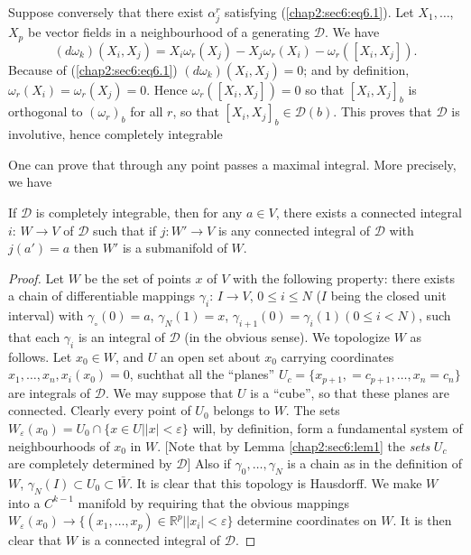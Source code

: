 Suppose conversely that there exist $\alpha^r_j$ satisfying
(\ref{chap2:sec6:eq6.1}). Let 
$X_1, \ldots$, $X_p$ be vector fields in a neighbourhood of a generating
$\mathscr{D}$. We have 
$$
(d \omega_k) (X_i, X_j) = X_i \omega_r (X_j) - X_j \omega_r
(X_i)-\omega_r ([X_i, X_j]). 
$$
Because of (\ref{chap2:sec6:eq6.1}) $(d \omega_k) (X_i, X_j) = 0$; and
by definition, 
$\omega_r (X_i) = \omega_r (X_j) = 0$. Hence $\omega_r ([X_i, X_j])=0$
so that $[X_i, X_j]_b$ is orthogonal to $(\omega_r)_b$ for all $r$, so
that $[X_i,X_j]_b \in \mathscr{D}(b)$. This proves that $\mathscr{D}$
is involutive, hence completely integrable 

One can prove that through any point passes a maximal integral. More
precisely, we have 

\begin{theorem*}[{\boldmath $3'$}]\label{chap2:sec6:thm3'} %
  If $\mathscr{D}$ is completely integrable, then for any $a \in V$,
  there exists a connected integral $i$: $ W \to V$ of $\mathscr{D}$
  such that if $j: W' \to V$ is any connected integral of
  $\mathscr{D}$ with $j(a') =a$ then $W'$ is a submanifold of $W$. 
\end{theorem*}

\begin{proof}
  Let $W$ be the set of points $x$ of $V$ with the following property:
  there exists a chain of differentiable mappings $\gamma_i$: $I \to
  V$, $0 \leq i \leq N$ ($I$ being the closed unit interval) with
  $\gamma_\circ (0) = a$, $\gamma_N(1)=x$, $\gamma_{i+1}(0) = \gamma_i
  (1) (0 \leq i < N)$, such that each $\gamma_i$ is an integral of
  $\mathscr{D}$ (in the obvious sense). We topologize $W$ as
  follows. Let $x_0 \in W$, and $U$ an open set about $x_0$ carrying
  coordinates $x_1, \ldots, x_n, x_i(x_0) = 0$, such\pageoriginale that all the
  ``planes'' $U_c = \{ x_{p+1}, = c_{p+1},\ldots, x_n = c_n\}$ are integrals of
  $\mathscr{D}$. We may suppose that $U$ is a ``cube'', so that these
  planes are connected. Clearly every point of $U_0$ belongs to
  $W$. The sets $W_ \varepsilon (x_0) = U_0 \cap \{ x \in U \bigg | |
  x | < \varepsilon \}$ will, by definition, form a fundamental system
  of neighbourhoods of $x_0$ in $W$. [Note that by Lemma
    \ref{chap2:sec6:lem1} the 
    \textit{sets} $U_c$ are completely determined by $\mathscr{D}$]
  Also if $\gamma_0, \ldots, \gamma_N$ is a chain as in the definition
  of $W$, $\gamma_N (I) \subset U_0 \subset \bar{W}$. It is clear that
  this topology is Hausdorff. We make $W$ into a $C^{k-1}$ manifold by
  requiring that the obvious mappings $W_ \varepsilon (x_0) \to \{
  (x_1, \ldots, x_p) \in \mathbb{R}^p \bigg| | x_i | < \varepsilon \}$
  determine coordinates on $W$. It is then clear that $W$ is a
  connected integral of $\mathscr{D}$. 
\end{proof}

